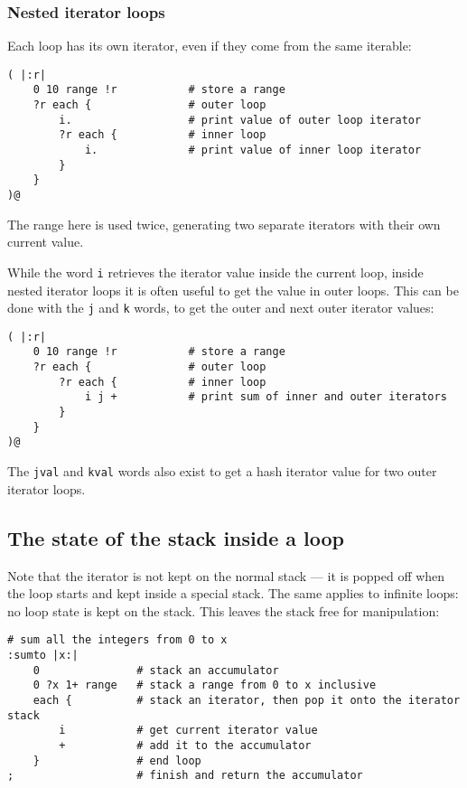 \subsubsection{Nested iterator loops}
\label{nestit}
Each loop has its own iterator, even if they come from the same iterable:
\begin{lstlisting}
( |:r|
    0 10 range !r           # store a range
    ?r each {               # outer loop
        i.                  # print value of outer loop iterator
        ?r each {           # inner loop
            i.              # print value of inner loop iterator
        }
    }
)@
\end{lstlisting}
The range here is used twice, generating two separate iterators with
their own current value.

While the word \texttt{i} retrieves the iterator value inside the current
loop, inside nested iterator loops it is often useful to get the value
in outer loops. This can be done with the \texttt{j} and \texttt{k} words,
to get the outer and next outer iterator values:
\begin{lstlisting}
( |:r|
    0 10 range !r           # store a range
    ?r each {               # outer loop
        ?r each {           # inner loop
            i j +           # print sum of inner and outer iterators
        }
    }
)@  
\end{lstlisting}
The \texttt{jval} and \texttt{kval}
words also exist to get a hash iterator value for two outer iterator loops.

\clearpage  
\subsection{The state of the stack inside a loop}
Note that the iterator is not kept on the normal stack --- it is popped
off when the loop starts and kept inside a special stack. The same
applies to infinite loops: no loop state is kept on the stack. This 
leaves the stack free for manipulation:
\begin{lstlisting}
# sum all the integers from 0 to x
:sumto |x:|
    0               # stack an accumulator
    0 ?x 1+ range   # stack a range from 0 to x inclusive
    each {          # stack an iterator, then pop it onto the iterator stack
        i           # get current iterator value
        +           # add it to the accumulator
    }               # end loop
;                   # finish and return the accumulator
\end{lstlisting}

